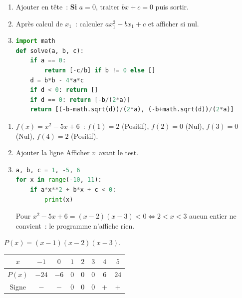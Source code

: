 
\begin{enumerate}
  \item Ajouter en t\^ete~: \textbf{Si} $a=0$, traiter $bx+c=0$ puis sortir.
  \item Apr\`es calcul de $x_1$~: calculer $ax_1^2+bx_1+c$ et afficher si nul.
  \item
\begin{lstlisting}[language=Python]
import math
def solve(a, b, c):
    if a == 0:
        return [-c/b] if b != 0 else []
    d = b*b - 4*a*c
    if d < 0: return []
    if d == 0: return [-b/(2*a)]
    return [(-b-math.sqrt(d))/(2*a), (-b+math.sqrt(d))/(2*a)]
\end{lstlisting}
\end{enumerate}


\begin{enumerate}
  \item $f(x)=x^2-5x+6$~: $f(1)=2$ (Positif), $f(2)=0$ (Nul),
        $f(3)=0$ (Nul), $f(4)=2$ (Positif).
  \item Ajouter la ligne \og Afficher $v$\fg\ avant le test.
  \item
\begin{lstlisting}[language=Python]
a, b, c = 1, -5, 6
for x in range(-10, 11):
    if a*x**2 + b*x + c < 0:
        print(x)
\end{lstlisting}
Pour $x^2-5x+6=(x-2)(x-3)<0\Leftrightarrow2<x<3$ aucun entier ne convient~: le programme n'affiche rien.
\end{enumerate}


$P(x)=(x-1)(x-2)(x-3)$.

\begin{center}
\begin{tabular}{c|ccccccc}
$x$ & $-1$ & $0$ & $1$ & $2$ & $3$ & $4$ & $5$ \\\hline
$P(x)$ & $-24$ & $-6$ & $0$ & $0$ & $0$ & $6$ & $24$ \\
Signe & $-$ & $-$ & $0$ & $0$ & $0$ & $+$ & $+$
\end{tabular}
\end{center}

